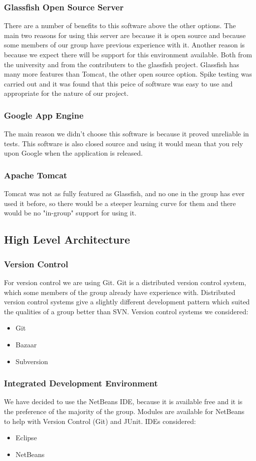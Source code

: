 \documentclass[titlepage]{article}
\begin{document}
\subsubsection{Glassfish Open Source Server}
There are a number of benefits to this software above the other options. The main two reasons for using this server are because it is open source and because some members of our group have previous experience with it. Another reason is because we expect there will be support for this environment available. Both from the university and from the contributers to the glassfish project. Glassfish has many more features than Tomcat, the other open source option. Spike testing was carried out and it was found that this peice of software was easy to use and appropriate for the nature of our project.
\subsubsection{Google App Engine}
The main reason we didn't choose this software is because it proved unreliable in tests. This software is also closed source and using it would mean that you rely upon Google when the application is released.
\subsubsection{Apache Tomcat}
Tomcat was not as fully featured as Glassfish, and no one in the group has ever used it before, so there would be a steeper learning curve for them and there would be no "in-group" support for using it.
\subsection{High Level Architecture}
\subsubsection{Version Control}
For version control we are using Git. Git is a distributed version control system, which some members of the group already have experience with. Distributed version control systems give a slightly different development pattern which suited the qualities of a group better than SVN. Version control systems we considered:
\begin{itemize}
\item{Git}
\item{Bazaar}
\item{Subversion}
\end{itemize}
\subsubsection{Integrated Development Environment}
We have decided to use the NetBeans IDE, because it is available free and it is the preference of the majority of the group. Modules are available for NetBeans to help with Version Control (Git) and JUnit.
IDEs considered:
\begin{itemize}
\item{Eclipse}
\item{NetBeans}
\end{itemize}
\end{document}
